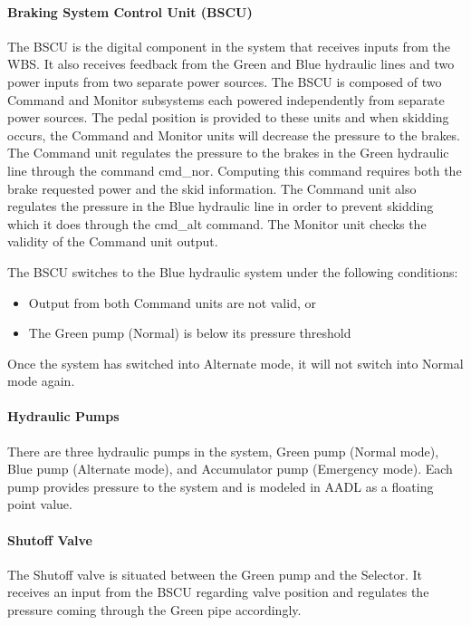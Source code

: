 \paragraph{Braking System Control Unit (BSCU)}
The BSCU is the digital component in the system that receives inputs from the WBS. It also receives feedback from the Green and Blue hydraulic lines and two power inputs from two separate power sources. The BSCU is composed of two Command and Monitor subsystems each powered independently from separate power sources. The pedal position is provided to these units and when skidding occurs, the Command and Monitor units will decrease the pressure to the brakes.
The Command unit regulates the pressure to the brakes in the Green hydraulic line through the command cmd\_nor. Computing this command requires both the brake requested power and the skid information. The Command unit also regulates the pressure in the Blue hydraulic line in order to prevent skidding which it does through the cmd\_alt command. The Monitor unit checks the validity of the Command unit output.

The BSCU switches to the Blue hydraulic system under the following conditions:
\begin{itemize}
\item Output from both Command units are not valid, or
\item The Green pump (Normal) is below its pressure threshold
\end{itemize}

\noindent Once the system has switched into Alternate mode, it will not switch into Normal mode again.

\paragraph{Hydraulic Pumps}
There are three hydraulic pumps in the system, Green pump (Normal mode), Blue pump (Alternate mode), and Accumulator pump (Emergency mode). Each pump provides pressure to the system and is modeled in AADL as a floating point value.

\paragraph{Shutoff Valve}

The Shutoff valve is situated between the Green pump and the Selector. It receives an input from the BSCU regarding valve position and regulates the pressure coming through the Green pipe accordingly.

